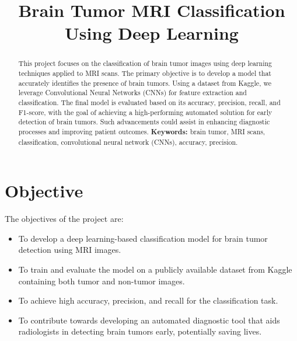 \documentclass{article}
\title{Brain Tumor MRI Classification Using Deep Learning}
\author{}
\date{}
\begin{document}
\maketitle

\begin{abstract}
This project focuses on the classification of brain tumor images using deep learning techniques applied to MRI scans. The primary objective is to develop a model that accurately identifies the presence of brain tumors. Using a dataset from Kaggle, we leverage Convolutional Neural Networks (CNNs) for feature extraction and classification. The final model is evaluated based on its accuracy, precision, recall, and F1-score, with the goal of achieving a high-performing automated solution for early detection of brain tumors. Such advancements could assist in enhancing diagnostic processes and improving patient outcomes.
\textbf{Keywords:} brain tumor, MRI scans, classification, convolutional neural network (CNNs), accuracy, precision.
\end{abstract}

\section{Objective}
The objectives of the project are:
\begin{itemize}
    \item To develop a deep learning-based classification model for brain tumor detection using MRI images.
    \item To train and evaluate the model on a publicly available dataset from Kaggle containing both tumor and non-tumor images.
    \item To achieve high accuracy, precision, and recall for the classification task.
    \item To contribute towards developing an automated diagnostic tool that aids radiologists in detecting brain tumors early, potentially saving lives.
\end{itemize}
\end{document}
